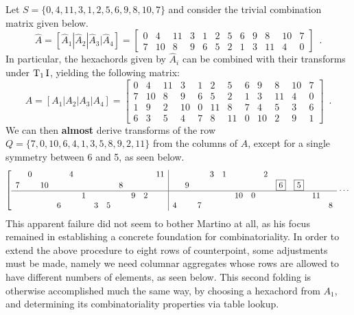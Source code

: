 \begin{example}
	\label{ex:martino-derivation}
	\cite[230]{Martino1961}
	Let $S = \{ 0, 4, 11, 3, 1, 2, 5, 6, 9, 8, 10, 7 \}$ and consider the trivial  combination matrix given below.
	\begin{equation}
    	\hat{A} = [\hat{A}_1 | \hat{A}_2 | \hat{A}_3 | \hat{A}_4] = \left[
    	\begin{array}{ccc|ccc|ccc|ccc}
        	0 & 4 & 11 & 3 & 1 & 2 & 5 & 6 & 9 & 8 & 10 & 7 \\
        	7 & 10 & 8 & 9 & 6 & 5 & 2 & 1 & 3 & 11 & 4 & 0
    	\end{array}
    	\right] \enspace.
	\end{equation}
	In particular, the hexachords given by $\hat{A}_i$ can be combined with their transforms under $\operatorname{T}_1\operatorname{I}$, yielding the following matrix:
	\begin{equation}
    	A = [A_1 | A_2 | A_3 | A_4] = \left[
    	\begin{array}{ccc|ccc|ccc|ccc}
        	0 & 4 & 11 & 3 & 1 & 2 & 5 & 6 & 9 & 8 & 10 & 7 \\
        	7 & 10 & 8 & 9 & 6 & 5 & 2 & 1 & 3 & 11 & 4 & 0 \\
        	\hline
        	1 & 9 & 2 & 10 & 0 & 11 & 8 & 7 & 4 & 5 & 3 & 6 \\
        	6 & 3 & 5 & 4 & 7 & 8 & 11 & 0 & 10 & 2 & 9 & 1
    	\end{array}
    	\right] \enspace.
	\end{equation}
	We can then \textbf{almost} derive transforms of the row $Q = \{ 7, 0, 10, 6, 4, 1, 3, 5, 8, 9, 2, 11 \}$ from the columns of $A$, except for a single symmetry between 6 and 5, as seen below.
	\begin{equation}
        \left[
        \begin{array}{cccccccccccc|cccccccccccc}
            & 0 &&& 4 &&&&&&& 11 &&&& 3 & 1 &&& 2 &&&& \\
            7 && 10 &&&&&& 8 &&& && 9 &&&&&&& \boxed{6} & \boxed{5} && \\
            \hline
            &&&&& 1 &&&& 9 & 2 & &&&&&& 10 & 0 &&&& 11 & \\
            &&& 6 &&& 3 & 5 &&&& & 4 && 7 &&&&&&&&& 8
        \end{array}
        \right. \cdots
    \end{equation}
    This apparent failure did not seem to bother Martino at all, as his focus remained in establishing a concrete foundation for combinatoriality. In order to extend the above procedure to eight rows of counterpoint, some adjustments must be made, namely we need columnar aggregates whose rows are allowed to have different numbers of elements, as seen below. This second folding is otherwise accomplished much the same way, by choosing a hexachord from $A_1$, and determining its combinatoriality properties via table lookup.

\end{example}
